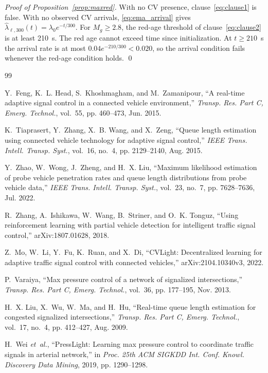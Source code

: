 \documentclass[letterpaper,journal]{IEEEtran}
\begin{document}
\emph{Proof of Proposition~\ref{prop:maxred}.}
With no CV presence, clause~\eqref{eq:clause1} is false. With no observed CV arrivals, \eqref{eq:ema_arrival} gives $\hat\lambda_{\ell,300}(t)=\lambda_0 e^{-t/300}$. For $M_g\ge2.8$, the red-age threshold of clause~\eqref{eq:clause2} is at least 210~s. The red age cannot exceed time since initialization. At $t\ge210$~s the arrival rate is at most $0.04e^{-210/300}<0.020$, so the arrival condition fails whenever the red-age condition holds. \qed

\begin{thebibliography}{99}

Y.~Feng, K.~L. Head, S.~Khoshmagham, and M.~Zamanipour, ``A real-time adaptive signal control in a connected vehicle environment,'' \emph{Transp. Res. Part C, Emerg. Technol.}, vol.~55, pp. 460--473, Jun. 2015.

K.~Tiaprasert, Y.~Zhang, X.~B. Wang, and X.~Zeng, ``Queue length estimation using connected vehicle technology for adaptive signal control,'' \emph{IEEE Trans. Intell. Transp. Syst.}, vol.~16, no.~4, pp. 2129--2140, Aug. 2015.

Y.~Zhao, W.~Wong, J.~Zheng, and H.~X. Liu, ``Maximum likelihood estimation of probe vehicle penetration rates and queue length distributions from probe vehicle data,'' \emph{IEEE Trans. Intell. Transp. Syst.}, vol.~23, no.~7, pp. 7628--7636, Jul. 2022.

R.~Zhang, A.~Ishikawa, W.~Wang, B.~Striner, and O.~K. Tonguz, ``Using reinforcement learning with partial vehicle detection for intelligent traffic signal control,'' arXiv:1807.01628, 2018.

Z.~Mo, W.~Li, Y.~Fu, K.~Ruan, and X.~Di, ``{CVLight}: Decentralized learning for adaptive traffic signal control with connected vehicles,'' arXiv:2104.10340v3, 2022.

P.~Varaiya, ``Max pressure control of a network of signalized intersections,'' \emph{Transp. Res. Part C, Emerg. Technol.}, vol.~36, pp. 177--195, Nov. 2013.

H.~X. Liu, X.~Wu, W.~Ma, and H.~Hu, ``Real-time queue length estimation for congested signalized intersections,'' \emph{Transp. Res. Part C, Emerg. Technol.}, vol.~17, no.~4, pp. 412--427, Aug. 2009.

H.~Wei \emph{et~al.}, ``{PressLight}: Learning max pressure control to coordinate traffic signals in arterial network,'' in \emph{Proc. 25th ACM SIGKDD Int. Conf. Knowl. Discovery Data Mining}, 2019, pp. 1290--1298.


\end{thebibliography}
\end{document}
